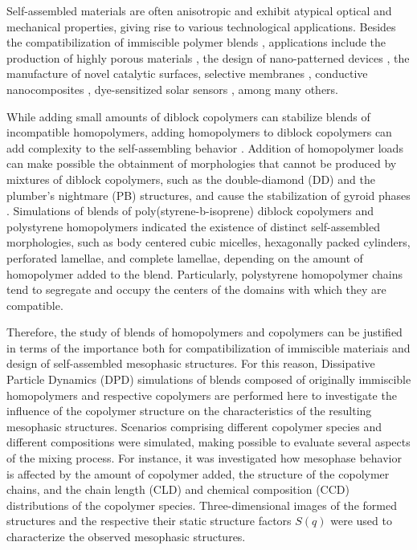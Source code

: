 \documentclass[
journal=mamobx,
manuscript=article,
]{achemso}
\begin{document}
Self-assembled materials are often anisotropic and exhibit atypical optical and mechanical properties, giving rise to various technological applications.
Besides the compatibilization of immiscible polymer blends \cite{Utracki_2002}, applications include the production of highly porous materials \cite{Uehara_2006, Kamperman_2004}, the design of nano-patterned devices \cite{Li_2006}, the manufacture of novel catalytic surfaces, selective membranes \cite{Yu_2015}, conductive nanocomposites \cite{Cho_2004}, dye-sensitized solar sensors \cite{Sun_2003, Watkins_2005}, among many others.

While adding small amounts of diblock copolymers can stabilize blends of incompatible homopolymers, adding homopolymers to diblock copolymers can add complexity to the self-assembling behavior \cite{Soto-Figueroa_2007}.
Addition of homopolymer loads can make possible the obtainment of morphologies that cannot be produced by mixtures of diblock copolymers, such as the double-diamond (DD) and the plumber's nightmare (PB) structures, and cause the stabilization of gyroid phases \cite{Martinez-Veracoechea_2009}.
Simulations of blends of poly(styrene-b-isoprene) diblock copolymers and polystyrene homopolymers \cite{Soto-Figueroa_2007} indicated the existence of distinct self-assembled morphologies, such as body centered cubic micelles, hexagonally packed cylinders, perforated lamellae, and complete lamellae, depending on the amount of homopolymer added to the blend.
Particularly, polystyrene homopolymer chains tend to segregate and occupy the centers of the domains with which they are compatible. \cite{Soto-Figueroa_2007}

Therefore, the study of blends of homopolymers and copolymers can be justified in terms of the importance both for compatibilization of immiscible materiais and design of self-assembled mesophasic structures.
For this reason, Dissipative Particle Dynamics (DPD) simulations of blends composed of originally immiscible homopolymers and respective copolymers are performed here to investigate the influence of the copolymer structure on the characteristics of the resulting mesophasic structures.
Scenarios comprising different copolymer species and different compositions were simulated, making possible to evaluate several aspects of the mixing process.
For instance, it was investigated how mesophase behavior is affected by the amount of copolymer added, the structure of the copolymer chains, and the chain length (CLD) and chemical composition (CCD) distributions of the copolymer species.
Three-dimensional images of the formed structures and the respective their static structure factors $S(q)$ were used to characterize the observed mesophasic structures.
\end{document}
